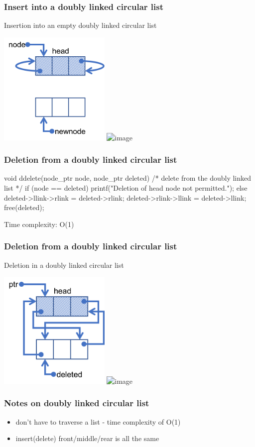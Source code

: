 \documentclass[newPxFont,sthlmFooter,nooffset]{beamer}
\begin{document}
\begin{frame}[t]
  \frametitle{Insert into a doubly linked circular list}

Insertion into an empty doubly linked circular list

    \includegraphics[width=0.4\textwidth]{figures/fig10_double_insert.png}
    \includegraphics<2>[width=0.4\textwidth]{figures/fig10_double_insert1.png}
  
\end{frame}

\begin{frame}[t, fragile]
  \frametitle{Deletion from a doubly linked circular list}
  \begin{ncodedef}
void ddelete(node_ptr node, node_ptr deleted) {
    /* delete from the doubly linked list */ 
    if (node == deleted)
        printf("Deletion of head node not permitted.\n");
    else {
        deleted->llink->rlink = deleted->rlink; 
        deleted->rlink->llink = deleted->llink; 
        free(deleted);
    } 
}    
  \end{ncodedef}

Time complexity: O(1)
\end{frame}

\begin{frame}[t]
  \frametitle{Deletion from a doubly linked circular list}
Deletion in a doubly linked circular list

    \includegraphics[width=0.4\textwidth]{figures/fig11_double_delete.png}
    \includegraphics<2>[width=0.4\textwidth]{figures/fig11_double_delete1.png}
  
\end{frame}

\begin{frame}[t]
  \frametitle{Notes on doubly linked circular list}
  \begin{itemize}
  \item don't have to traverse a list - time complexity of O(1)
  \item insert(delete) front/middle/rear is all the same
  \end{itemize}
\end{frame}
\end{document}
